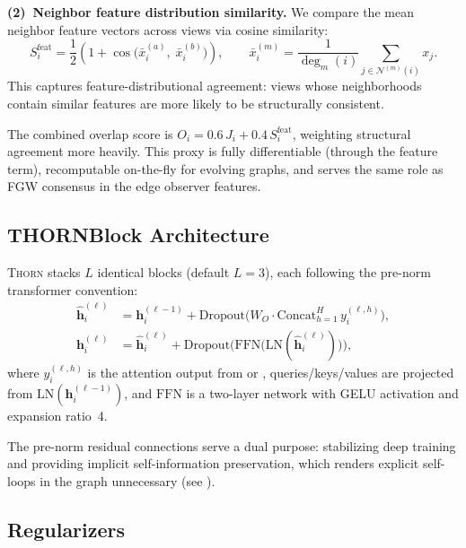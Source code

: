 \documentclass[11pt,a4paper]{article}
\newcommand{\thorn}{\textsc{Thorn}}
\newcommand{\calN}{\mathcal{N}}
\begin{document}
\textbf{(2)~Neighbor feature distribution similarity.}
We compare the mean neighbor feature vectors across views via cosine
similarity:
\begin{equation}
  \label{eq:feat_sim}
  S_i^{\text{feat}} = \frac{1}{2}\left(
    1 + \cos\!\Big(\bar{x}_i^{(a)},\; \bar{x}_i^{(b)}\Big)
  \right),
  \qquad
  \bar{x}_i^{(m)} = \frac{1}{\deg_m(i)}
    \sum_{j \in \calN^{(m)}(i)} x_j.
\end{equation}
This captures feature-distributional agreement: views whose neighborhoods
contain similar features are more likely to be structurally consistent.

The combined overlap score is $O_i = 0.6\, J_i + 0.4\, S_i^{\text{feat}}$,
weighting structural agreement more heavily.
This proxy is fully differentiable (through the feature term),
recomputable on-the-fly for evolving graphs, and serves the same role
as FGW consensus in the edge observer features.

\subsection{THORNBlock Architecture}
\label{sec:thornblock}

\thorn{} stacks $L$ identical blocks (default $L = 3$), each following
the pre-norm transformer convention:
\begin{align}
  \hat{\mathbf{h}}_i^{(\ell)} &= \mathbf{h}_i^{(\ell-1)} +
    \mathrm{Dropout}\!\Big(
      W_O \cdot \mathrm{Concat}_{h=1}^{H}\, y_i^{(\ell, h)}
    \Big),
  \label{eq:block_attn} \\
  \mathbf{h}_i^{(\ell)} &= \hat{\mathbf{h}}_i^{(\ell)} +
    \mathrm{Dropout}\!\Big(
      \mathrm{FFN}\!\big(\mathrm{LN}(\hat{\mathbf{h}}_i^{(\ell)})\big)
    \Big),
  \label{eq:block_ffn}
\end{align}
where $y_i^{(\ell, h)}$ is the attention output from 
or , queries/keys/values are projected from
$\mathrm{LN}(\mathbf{h}_i^{(\ell-1)})$, and $\mathrm{FFN}$ is a
two-layer network with GELU activation and expansion ratio~4.

The pre-norm residual connections serve a dual purpose: stabilizing deep
training and providing implicit self-information preservation, which
renders explicit self-loops in the graph unnecessary (see
).

\subsection{Regularizers}
\label{sec:regularizers}
\end{document}
